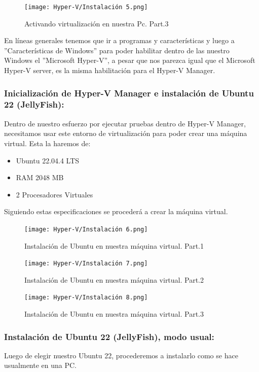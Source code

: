 \documentclass[journal]{IEEEtran}
\begin{document}
\begin{figure}[htbp]
  \centering
  \texttt{[image: Hyper-V/Instalación 5.png]}
  \caption{Activando virtualización en nuestra Pc. Part.3}
\end{figure}

En líneas generales tenemos que ir a programas y características y luego a ''Características de Windows'' para poder habilitar dentro de las nuestro Windows el ''Microsoft Hyper-V'', a pesar que nos parezca igual que el Microsoft Hyper-V server, es la misma habilitación para el Hyper-V Manager\cite{Wlear2024}.\\

\subsubsection{Inicialización de Hyper-V Manager e instalación de Ubuntu 22 (JellyFish):}

Dentro de nuestro esfuerzo por ejecutar pruebas dentro de Hyper-V Manager, necesitamos usar este entorno de virtualización para poder crear una máquina virtual. Esta la haremos de:
\begin{itemize}
    \item Ubuntu 22.04.4 LTS
    \item RAM 2048 MB
    \item 2 Procesadores Virtuales
\end{itemize}
Siguiendo estas especificaciones se procederá a crear la máquina virtual.

\begin{figure}[htbp]
  \centering
  \texttt{[image: Hyper-V/Instalación 6.png]}
  \caption{Instalación de Ubuntu en nuestra máquina virtual. Part.1}
\end{figure}

\begin{figure}[htbp]
  \centering
  \texttt{[image: Hyper-V/Instalación 7.png]}
  \caption{Instalación de Ubuntu en nuestra máquina virtual. Part.2}
\end{figure}

\begin{figure}[htbp]
  \centering
  \texttt{[image: Hyper-V/Instalación 8.png]}
  \caption{Instalación de Ubuntu en nuestra máquina virtual. Part.3}
\end{figure}

\subsubsection{Instalación de Ubuntu 22 (JellyFish), modo usual:}
Luego de elegir nuestro Ubuntu 22, procederemos a instalarlo como se hace usualmente en una PC.\\
\end{document}
